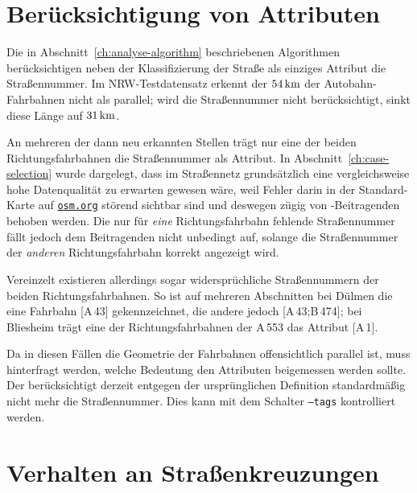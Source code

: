 \documentclass[../main/thesis.tex]{subfiles}
\begin{document}
\section{Berücksichtigung von Attributen}
\label{ch:result-tags}

Die in Abschnitt~\ref{ch:analyse-algorithm} beschriebenen Algorithmen berücksichtigen neben der Klassifizierung der Straße als einziges Attribut die Straßennummer.
Im NRW-Testdatensatz erkennt der  $\unit[54]{km}$ der Autobahn-Fahrbahnen nicht als parallel; wird die Straßennummer nicht berücksichtigt, sinkt diese Länge auf $\unit[31]{km}$.

An mehreren der dann neu erkannten Stellen trägt nur eine der beiden Richtungsfahrbahnen die Straßennummer als Attribut.
In Abschnitt~\ref{ch:case-selection} wurde dargelegt, dass im Straßennetz grundsätzlich eine vergleichsweise hohe Datenqualität zu erwarten gewesen wäre, weil Fehler darin in der Standard-Karte auf \href{https://www.openstreetmap.org/}{\nolinkurl{osm.org}} störend sichtbar sind und deswegen zügig von \osm-Beitragenden behoben werden.
Die nur für \emph{eine} Richtungsfahrbahn fehlende Straßennummer fällt jedoch dem Beitragenden nicht unbedingt auf, solange die Straßennummer der \emph{anderen} Richtungsfahrbahn korrekt angezeigt wird.

Vereinzelt existieren allerdings sogar widersprüchliche Straßennummern der beiden Richtungsfahrbahnen.
So ist auf mehreren Abschnitten bei Dülmen die eine Fahrbahn [A\,43] gekennzeichnet, die andere jedoch [A\,43;B\,474]; bei Bliesheim trägt eine der Richtungsfahrbahnen der A\,553 das Attribut [A\,1].

Da in diesen Fällen die Geometrie der Fahrbahnen offensichtlich parallel ist, muss hinterfragt werden, welche Bedeutung den Attributen beigemessen werden sollte.
Der  berücksichtigt derzeit entgegen der ursprünglichen Definition standardmäßig nicht mehr die Straßennummer.
Dies kann mit dem Schalter \texttt{--tags} kontrolliert werden.



\section{Verhalten an Straßenkreuzungen}
\label{ch:result-junctions}
\end{document}
